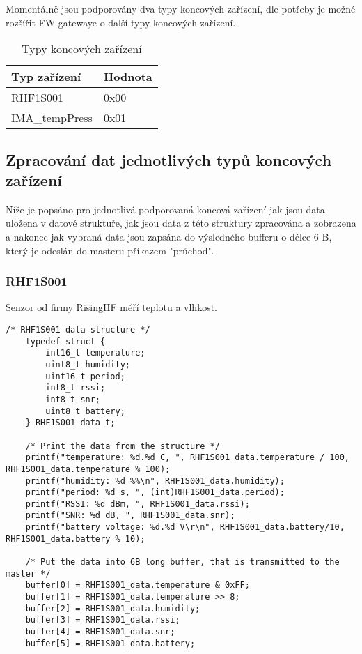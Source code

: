Momentálně jsou podporovány dva typy koncových zařízení, dle potřeby je možné rozšířit FW gatewaye o další typy koncových zařízení.

\begin{table}[!h]
    \centering
    \begin{tabular}{ |l|l| }
     \hline

     Typ zařízení       & Hodnota         \\ \hline \hline
     RHF1S001           & 0x00            \\ \hline
     IMA\_tempPress     & 0x01            \\ \hline
     
    \end{tabular}
    \caption{Typy koncových zařízení}
    \label{table:TypyKoncZarizeni}
\end{table}

\subsection{Zpracování dat jednotlivých typů koncových zařízení}
Níže je popsáno pro jednotlivá podporovaná koncová zařízení jak jsou data uložena v datové struktuře, jak jsou data z této struktury zpracována a zobrazena a nakonec jak vybraná data jsou zapsána do výsledného bufferu o délce 6 B, který je odeslán do masteru příkazem "průchod".

\subsubsection{RHF1S001}
Senzor od firmy RisingHF měří teplotu a vlhkost.

\begin{lstlisting}[style=CStyle]
    /* RHF1S001 data structure */   
    typedef struct {
        int16_t temperature;
        uint8_t humidity;
        uint16_t period;
        int8_t rssi;
        int8_t snr;
        uint8_t battery;
    } RHF1S001_data_t;

    /* Print the data from the structure */
	printf("temperature: %d.%d C, ", RHF1S001_data.temperature / 100, RHF1S001_data.temperature % 100);
	printf("humidity: %d %%\n", RHF1S001_data.humidity);
	printf("period: %d s, ", (int)RHF1S001_data.period);
	printf("RSSI: %d dBm, ", RHF1S001_data.rssi);
	printf("SNR: %d dB, ", RHF1S001_data.snr);
	printf("battery voltage: %d.%d V\r\n", RHF1S001_data.battery/10, RHF1S001_data.battery % 10);

    /* Put the data into 6B long buffer, that is transmitted to the master */
	buffer[0] = RHF1S001_data.temperature & 0xFF;
	buffer[1] = RHF1S001_data.temperature >> 8;
	buffer[2] = RHF1S001_data.humidity;
	buffer[3] = RHF1S001_data.rssi;
	buffer[4] = RHF1S001_data.snr;
	buffer[5] = RHF1S001_data.battery;
\end{lstlisting}


